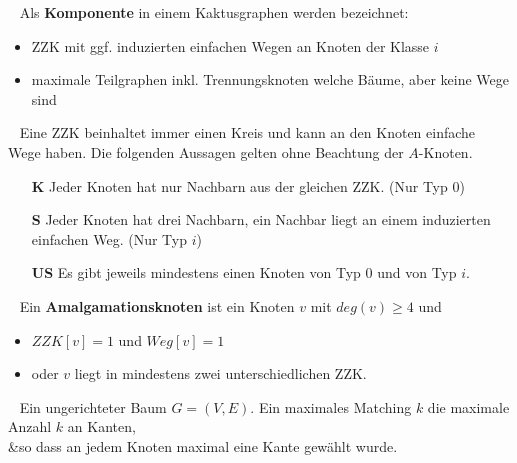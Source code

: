 \begin{defi}[Komponente]~\newline
Als \textbf{Komponente} in einem Kaktusgraphen werden bezeichnet:\vspace{-1mm}
\begin{itemize}
\item ZZK mit ggf. induzierten einfachen Wegen an Knoten der Klasse $i$\vspace{-1mm}
\item maximale Teilgraphen inkl. Trennungsknoten welche Bäume, aber keine Wege sind 
\end{itemize}
\end{defi}
\vspace{-1mm}
\begin{defi}~\newline
Eine ZZK beinhaltet immer einen Kreis und kann an den Knoten einfache Wege haben. Die folgenden Aussagen gelten ohne Beachtung der $A$-Knoten.\vspace{-1mm} 
\begin{itemize}
\item[\textbf{K}] Jeder Knoten hat nur Nachbarn aus der gleichen ZZK. (Nur Typ $0$)\vspace{-1mm}
\item[\textbf{S}] Jeder Knoten hat drei Nachbarn, ein Nachbar liegt an einem induzierten einfachen Weg. (Nur Typ $i$)\vspace{-1mm}
\item[\textbf{US}] Es gibt jeweils mindestens einen Knoten von Typ $0$ und von Typ $i$.
\end{itemize}
\end{defi}
\vspace{-1mm}
\begin{defi}[Amalgamationsknoten]~\newline
Ein \textbf{Amalgamationsknoten} ist ein Knoten $v$ mit $deg(v)\geq 4$ und \vspace{-1mm}
\begin{itemize}
\item $ZZK[v]=1$ und $Weg[v]=1$\vspace{-1mm}
\item oder $v$ liegt in mindestens zwei unterschiedlichen ZZK.
\end{itemize}
\end{defi}
\vspace{-1mm}
\begin{defi}~\newline
\vspace{-7mm}
{Ein ungerichteter Baum $G=(V,E)$.}
{Ein maximales Matching $k$ die maximale Anzahl $k$ an Kanten,\\&so dass an jedem Knoten maximal eine Kante gewählt wurde.}
\end{defi}
\vspace{-5mm}
\newpage
